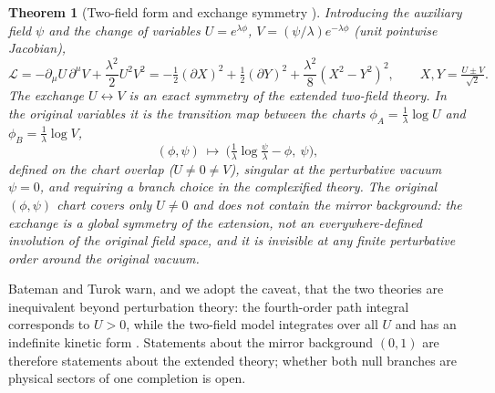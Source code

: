 \documentclass[11pt]{article}
\newtheorem{theorem}{Theorem}[section]
\theoremstyle{definition}
\theoremstyle{remark}
\begin{document}
\begin{theorem}[Two-field form and exchange symmetry
{\cite[adapted]{BT2026}}]\label{thm:twofield}
Introducing the auxiliary field $\psi$ and the change of variables
$U=e^{\lambda\phi}$, $V=(\psi/\lambda)e^{-\lambda\phi}$ (unit pointwise
Jacobian),
\begin{equation}
\mathcal L
=-\partial_\mu U\,\partial^\mu V+\frac{\lambda^2}{2}U^2V^2
=-\tfrac12(\partial X)^2+\tfrac12(\partial Y)^2
+\frac{\lambda^2}{8}(X^2-Y^2)^2,
\qquad X,Y=\tfrac{U\pm V}{\sqrt2}.
\end{equation}
The exchange $U\leftrightarrow V$ is an exact symmetry \emph{of the
extended two-field theory}.  In the original variables it is the
transition map between the charts $\phi_A=\tfrac1\lambda\log U$ and
$\phi_B=\tfrac1\lambda\log V$,
\begin{equation}
(\phi,\psi)\ \longmapsto\
\Big(\tfrac1\lambda\log\tfrac{\psi}{\lambda}-\phi,\ \psi\Big),
\end{equation}
defined on the chart overlap ($U\neq0\neq V$), singular at the
perturbative vacuum $\psi=0$, and requiring a branch choice in the
complexified theory.  The original $(\phi,\psi)$ chart covers only
$U\neq0$ and does not contain the mirror background: the exchange is a
global symmetry of the extension, not an everywhere-defined involution
of the original field space, and it is invisible at any finite
perturbative order around the original vacuum.
\end{theorem}

Bateman and Turok warn, and we adopt the caveat, that the two theories
are inequivalent beyond perturbation theory: the fourth-order path
integral corresponds to $U>0$, while the two-field model integrates
over all $U$ and has an indefinite kinetic form \cite{BT2026}.
Statements about the mirror background $(0,1)$ are therefore
statements about the extended theory; whether both null branches are
physical sectors of one completion is open.
\end{document}
